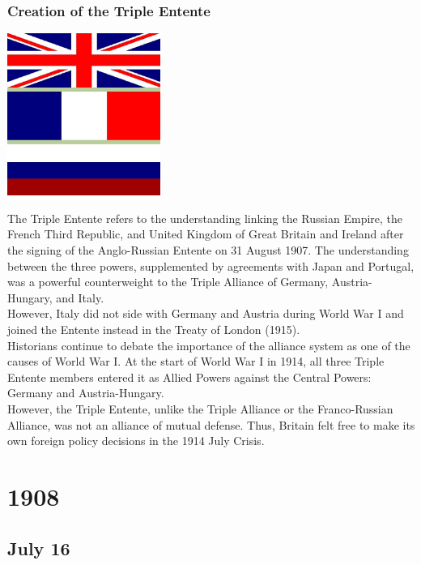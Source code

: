 \documentclass[11pt]{report}
\begin{document}
\subsection{Creation of the Triple Entente}
\vspace{2mm}\begin{center}\includegraphics[width=5cm]{./img/tripleEntente.jpg}\end{center}
The Triple Entente refers to the understanding linking the Russian Empire, the French Third Republic, and United Kingdom of Great Britain and Ireland after the signing of the Anglo-Russian Entente on 31 August 1907. The understanding between the three powers, supplemented by agreements with Japan and Portugal, was a powerful counterweight to the Triple Alliance of Germany, Austria-Hungary, and Italy.\\
However, Italy did not side with Germany and Austria during World War I and joined the Entente instead in the Treaty of London (1915).\\
Historians continue to debate the importance of the alliance system as one of the causes of World War I. At the start of World War I in 1914, all three Triple Entente members entered it as Allied Powers against the Central Powers: Germany and Austria-Hungary.\\
However, the Triple Entente, unlike the Triple Alliance or the Franco-Russian Alliance, was not an alliance of mutual defense. Thus, Britain felt free to make its own foreign policy decisions in the 1914 July Crisis.

\chapter{1908}
\section{July 16}
\end{document}
